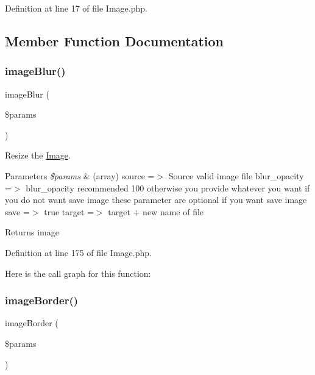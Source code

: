 Definition at line 17 of file Image.\+php.



\subsection{Member Function Documentation}
\mbox{\label{class_zest_1_1_image_1_1_image_a396a84193e0d452555d48e21fa950faa}} 
\subsubsection{\texorpdfstring{image\+Blur()}{imageBlur()}}
{\footnotesize\ttfamily image\+Blur (\begin{DoxyParamCaption}\item[{}]{\$params }\end{DoxyParamCaption})}

Resize the \mbox{\hyperlink{class_zest_1_1_image_1_1_image}{Image}}.


\begin{DoxyParams}{Parameters}
{\em \$params} & (array) \textquotesingle{}source\textquotesingle{} =$>$ Source valid image file \textquotesingle{}blur\+\_\+opacity\textquotesingle{} =$>$ blur\+\_\+opacity recommended 100 otherwise you provide whatever you want if you do not want save image these parameter are optional if you want save image \textquotesingle{}save\textquotesingle{} =$>$ true \textquotesingle{}target\textquotesingle{} =$>$ target + new name of file\\
\hline
\end{DoxyParams}
\begin{DoxyReturn}{Returns}
image 
\end{DoxyReturn}


Definition at line 175 of file Image.\+php.

Here is the call graph for this function\+:
\mbox{\label{class_zest_1_1_image_1_1_image_a2bf10c2919bcc6feffc6acc80d5b1fb6}} 
\subsubsection{\texorpdfstring{image\+Border()}{imageBorder()}}
{\footnotesize\ttfamily image\+Border (\begin{DoxyParamCaption}\item[{}]{\$params }\end{DoxyParamCaption})}

